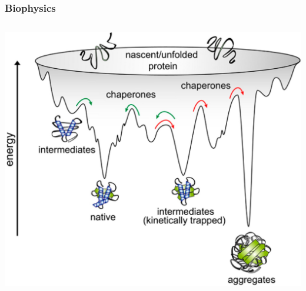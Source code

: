 \documentclass[aspectratio=169]{beamer}
\begin{document}
\begin{frame}
    \frametitle{Biophysics}
    \begin{columns}
        
        \includegraphics[width=\textwidth]{figures/proteins}
        
    \end{columns}
\end{frame}
\end{document}
